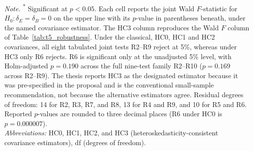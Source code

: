 \vspace{4pt}
{\footnotesize\noindent
\textit{Note.} \textsuperscript{*} Significant at $p < 0.05$. Each cell reports the joint Wald $F$-statistic for $H_0: \delta_E = \delta_B = 0$ on the upper line with its $p$-value in parentheses beneath, under the named covariance estimator. The HC3 column reproduces the Wald $F$ column of Table~\ref{tab:t5_robustness}. Under the classical, HC0, HC1 and HC2 covariances, all eight tabulated joint tests R2--R9 reject at 5\%, whereas under HC3 only R6 rejects. R6 is significant only at the unadjusted 5\% level, with Holm-adjusted $p = 0.190$ across the full nine-test family R2--R10 ($p = 0.169$ across R2--R9). The thesis reports HC3 as the designated estimator because it was pre-specified in the proposal and is the conventional small-sample recommendation, not because the alternative estimators agree. Residual degrees of freedom: 14 for R2, R3, R7, and R8, 13 for R4 and R9, and 10 for R5 and R6. Reported $p$-values are rounded to three decimal places (R6 under HC0 is $p = 0.000007$). \\
\textit{Abbreviations:} HC0, HC1, HC2, and HC3 (heteroskedasticity-consistent covariance estimators), df (degrees of freedom).
\par}

